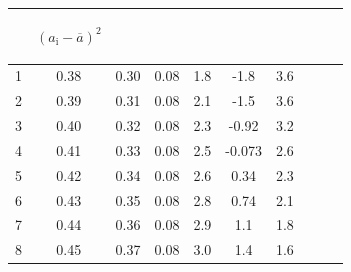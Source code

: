 \begin{center}
\begin{table}[H]
\begin{tabular}{|c|c|c|c|c|c|c|c|c|c|}
\begin{minipage}{21mm}
\end{minipage}&
\begin{minipage}{21mm}
     \begin{center} $(a_{\text{i}}-\overline{a})^2$ \end{center}
\end{minipage}\\
\hline
1 &  0.38  &  0.30  & 0.08 & 1.8& -1.8&3.6 & & & \\
2 &  0.39  &  0.31  &  0.08 & 2.1& -1.5&3.6 & & &\\
3 &  0.40  &  0.32  & 0.08  & 2.3& -0.92&3.2 & & &\\
4 & 0.41  &  0.33 &  0.08 & 2.5& -0.073&2.6  & & &\\
5 & 0.42  &  0.34  &  0.08 &  2.6&0.34 &2.3 & & &  \\
6 & 0.43  &  0.35  &  0.08 & 2.8&0.74 &2.1 & & & \\
7 & 0.44  &  0.36  &  0.08 & 2.9&1.1 &1.8 & & &  \\
8 & 0.45  &  0.37  &  0.08 & 3.0& 1.4 &1.6 & & &  \\

\hline
\end{tabular}
\end{table}
\end{center}
